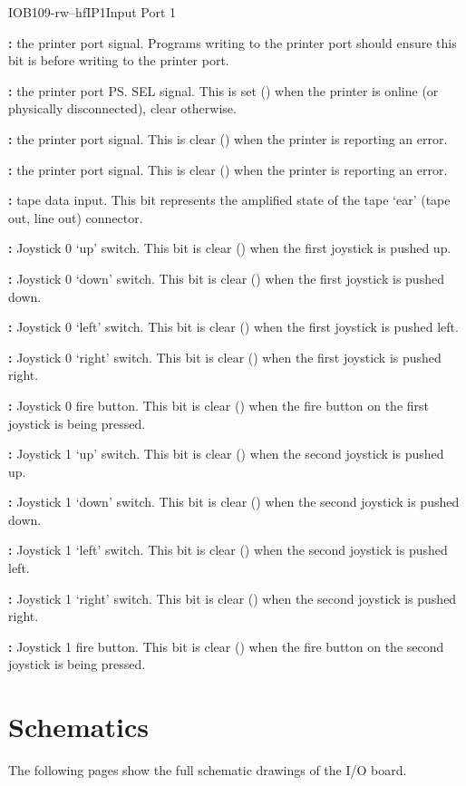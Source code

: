 \begin{ioport}{IOB}{109}{-rw--hf}{IP1}{Input Port 1}
  \begin{description}
  \item{\bfseries {}:} the printer port  signal. Programs
    writing to the printer port should ensure this bit is  before
    writing to the printer port.
  \item{\bfseries {}:} the printer port \ps{SEL} signal. This is set
    () when the printer is online (or physically disconnected), clear
    otherwise.
  \item{\bfseries {}:} the printer port  signal. This is clear
    () when the printer is reporting an error.
  \item{\bfseries {}:} the printer port  signal. This is clear
    () when the printer is reporting an error.
  \item{\bfseries {}:} tape data input. This bit represents the amplified state of
    the tape ‘ear’ (tape out, line out) connector.
  \item{\bfseries {}:} Joystick 0 ‘up’ switch. This bit is clear
    () when the first joystick is pushed up.
  \item{\bfseries {}:} Joystick 0 ‘down’ switch. This bit is clear
    () when the first joystick is pushed down.
  \item{\bfseries {}:} Joystick 0 ‘left’ switch. This bit is clear
    () when the first joystick is pushed left.
  \item{\bfseries {}:} Joystick 0 ‘right’ switch. This bit is clear
    () when the first joystick is pushed right.
  \item{\bfseries {}:} Joystick 0 fire button. This bit is clear
    () when the fire button on the first joystick is being pressed.
  \item{\bfseries {}:} Joystick 1 ‘up’ switch. This bit is clear
    () when the second joystick is pushed up.
  \item{\bfseries {}:} Joystick 1 ‘down’ switch. This bit is clear
    () when the second joystick is pushed down.
  \item{\bfseries {}:} Joystick 1 ‘left’ switch. This bit is clear
    () when the second joystick is pushed left.
  \item{\bfseries {}:} Joystick 1 ‘right’ switch. This bit is clear
    () when the second joystick is pushed right.
  \item{\bfseries {}:} Joystick 1 fire button. This bit is clear
    () when the fire button on the second joystick is being pressed.
  \end{description}

\end{ioport}

\section{Schematics}

The following pages show the full schematic drawings of the I/O board.

\cleardoublepage
{}
